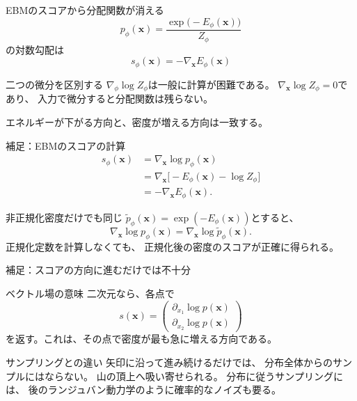 \asmain
\begin{frame}{EBMのスコアから分配関数が消える}
    \[
        p_\phi(\bm{x})
        =
        \frac{\exp\!\bigl(-E_\phi(\bm{x})\bigr)}{Z_\phi}
\]
    の対数勾配は
    \[
        s_\phi(\bm{x})
        =
        -\nabla_{\bm{x}}E_\phi(\bm{x})
\]
    \begin{block}{二つの微分を区別する}
        $\nabla_\phi\log Z_\phi$は一般に計算が困難である。
        $\nabla_{\bm{x}}\log Z_\phi=0$であり、
        入力で微分すると分配関数は残らない。
    \end{block}
    エネルギーが下がる方向と、密度が増える方向は一致する。
\end{frame}
\assuppl
\begin{frame}{補足：EBMのスコアの計算}
    \begin{align*}
        s_\phi(\bm{x})
        &=
        \nabla_{\bm{x}}\log p_\phi(\bm{x})\\
        &=
        \nabla_{\bm{x}}
        \bigl[-E_\phi(\bm{x})-\log Z_\phi\bigr]\\
        &=
        -\nabla_{\bm{x}}E_\phi(\bm{x}).
    \end{align*}
    \begin{exampleblock}{非正規化密度だけでも同じ}
        $\tilde{p}_\phi(\bm{x})=\exp(-E_\phi(\bm{x}))$とすると、
        \[
            \nabla_{\bm{x}}\log p_\phi(\bm{x})
            =
            \nabla_{\bm{x}}\log\tilde{p}_\phi(\bm{x}).
\]
        正規化定数を計算しなくても、
        正規化後の密度のスコアが正確に得られる。
    \end{exampleblock}
\end{frame}
\assuppl
\begin{frame}{補足：スコアの方向に進むだけでは不十分}
    \begin{exampleblock}{ベクトル場の意味}
        二次元なら、各点で
        \[
            s(\bm{x})
            =
            \begin{pmatrix}
                \partial_{x_1}\log p(\bm{x})\\
                \partial_{x_2}\log p(\bm{x})
            \end{pmatrix}
\]
        を返す。これは、その点で密度が最も急に増える方向である。
    \end{exampleblock}
    \begin{exampleblock}{サンプリングとの違い}
        矢印に沿って進み続けるだけでは、
        分布全体からのサンプルにはならない。
        山の頂上へ吸い寄せられる。
        分布に従うサンプリングには、
        後のランジュバン動力学のように確率的なノイズも要る。
    \end{exampleblock}
\end{frame}
